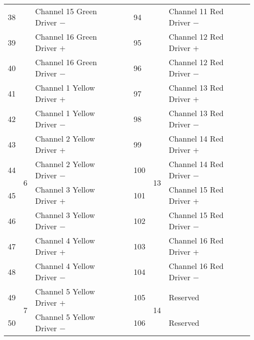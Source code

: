 \documentclass[]{article}
\begin{document}
\begin{table}[]
\begin{tabular}{@{}lllllll@{}}
		38           &                    & Channel 15 Green Driver $-$   &                   & 94           &                     & Channel 11 Red Driver $-$    \\
		39           &                    & Channel 16 Green Driver $+$   &                   & 95           &                     & Channel 12 Red Driver $+$    \\
		40           &                    & Channel 16 Green Driver $-$   &                   & 96           &                     & Channel 12 Red Driver $-$    \\ \cmidrule(r){1-3} \cmidrule(l){5-7} 
		41           & \multirow{8}{*}{6} & Channel 1 Yellow Driver $+$   &                   & 97           & \multirow{8}{*}{13} & Channel 13 Red Driver $+$    \\
		42           &                    & Channel 1 Yellow Driver $-$   &                   & 98           &                     & Channel 13 Red Driver $-$    \\
		43           &                    & Channel 2 Yellow Driver $+$   &                   & 99           &                     & Channel 14 Red Driver $+$    \\
		44           &                    & Channel 2 Yellow Driver $-$   &                   & 100          &                     & Channel 14 Red Driver $-$    \\
		45           &                    & Channel 3 Yellow Driver $+$   &                   & 101          &                     & Channel 15 Red Driver $+$    \\
		46           &                    & Channel 3 Yellow Driver $-$   &                   & 102          &                     & Channel 15 Red Driver $-$    \\
		47           &                    & Channel 4 Yellow Driver $+$   &                   & 103          &                     & Channel 16 Red Driver $+$    \\
		48           &                    & Channel 4 Yellow Driver $-$   &                   & 104          &                     & Channel 16 Red Driver $-$    \\ \cmidrule(r){1-3} \cmidrule(l){5-7} 
		49           & \multirow{8}{*}{7} & Channel 5 Yellow Driver $+$   &                   & 105          & \multirow{8}{*}{14} & Reserved                     \\
		50           &                    & Channel 5 Yellow Driver $-$   &                   & 106          &                     & Reserved                     \\

\end{tabular}
\end{table}
\end{document}
